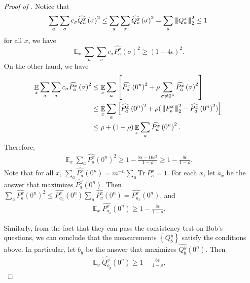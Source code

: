 \documentclass[10pt,a4paper]{article}
\theoremstyle{plain}
\theoremstyle{definition}
\newcommand {\set} [1] {\ensuremath{ \left\lbrace #1 \right\rbrace }}
\newcommand {\br} [1] {\ensuremath{ \left( #1 \right) }}
\DeclareMathOperator*{\bigE}{\mathbb{E}}
\newcommand{\nnorm}[1]{{\left\vert\kern-0.25ex\left\vert\kern-0.25ex\left\vert #1
		\right\vert\kern-0.25ex\right\vert\kern-0.25ex\right\vert}}
\newcommand {\Tr} {\ensuremath{ \mathrm{Tr} }}
\newcommand{\1}{\mathbb{1}} %
\begin{document}
\begin{proof}[Proof of ]
Notice that $$\sum_a \sum_\sigma c_{\sigma} \widehat{Q^x_a}\br{\sigma}^2\leq\sum_a \sum_\sigma\widehat{Q^x_a}\br{\sigma}^2=\sum_a\nnorm{Q^x_a}^2_2\leq1$$ for all $x$, we have
\[\bigE_x \sum_a \sum_\sigma c_{\sigma} \widehat{P^x_a}\br{\sigma}^2\geq(1-4\epsilon)^2.\]
On the other hand, we have
\begin{align*}
    \bigE_x \sum_a \sum_\sigma c_{\sigma} \widehat{P^x_a}\br{\sigma}^2
    &\leq \bigE_x \sum_a 
    \left[\widehat{P^x_a}\br{0^n}^2 + \rho  \sum_{\sigma \neq 0^n} \widehat{P^x_a}\br{\sigma}^2\right] \\
    &\leq \bigE_x \sum_a
    \left[\widehat{P^x_a}\br{0^n}^2 + \rho(\nnorm{P^x_a}_2^2 - \widehat{P^x_a}\br{0^n}^2) \right] \\
    &\leq \rho + (1-\rho) \bigE_x \sum_a \widehat{P^x_a}\br{0^n}^2.
\end{align*}
Therefore,
\begin{align}
    \bigE_x \sum_a \widehat{P^x_a}\br{0^n}^2 \geq 1 - \frac{8\epsilon -16\epsilon^2}{1-\rho}\geq1-\frac{8\epsilon}{1-\rho}.
\end{align}
Note that for all $x$, $\sum_a \widehat{P^x_a}\br{0^n} =m^{-n}\sum_a\Tr~P^x_a=1$.
For each $x$, let $a_x$ be the answer that maximizes $\widehat{P^x_a}\br{0^n}$.
Then $\sum_a \widehat{P^x_a}\br{0^n}^2 \leq \widehat{P^x_{a_x}}\br{0^n}\sum_a \widehat{P^x_a}\br{0^n} = \widehat{P^x_{a_x}}\br{0^n}$, and
\begin{align*}
  \bigE_x \widehat{P^x_{a_x}}\br{0^n} \geq 1 - \frac{8\epsilon }{1-\rho}.
\end{align*}

Similarly, from the fact that they can pass the consistency test on Bob's questions, we can conclude that the measurements $\set{ Q^y_b }$ satisfy the conditions above.
In particular, let $b_y$ be the answer that maximizes $\widehat{Q^y_b}\br{0^n}$. Then
\begin{align*}
    \bigE_{y} \widehat{Q^y_{b_y}}\br{0^n} \geq 1 - \frac{8\epsilon}{1-\rho}.
\end{align*}


\end{proof}
\end{document}
